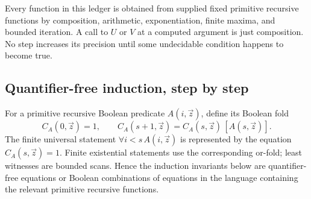 Every function in this ledger is obtained from supplied fixed
primitive recursive functions by composition, arithmetic,
exponentiation, finite maxima, and bounded iteration. A call
to $U$ or $V$ at a computed argument is just composition.
No step increases its precision until some undecidable
condition happens to become true.

\subsection{Quantifier-free induction, step by step}
\label{sec:qfind}

For a primitive recursive Boolean predicate $A(i,\vec z)$, define its
Boolean fold
\[
 C_A(0,\vec z)=1,\qquad
 C_A(s+1,\vec z)=
     C_A(s,\vec z)\,[A(s,\vec z)].
\]
The finite universal statement
$\forall i<s\,A(i,\vec z)$ is represented by the equation
$C_A(s,\vec z)=1$. Finite existential statements use the
corresponding or-fold; least witnesses are bounded scans.
Hence the induction invariants below are quantifier-free
equations or Boolean combinations of equations in the
language containing the relevant primitive recursive functions.

